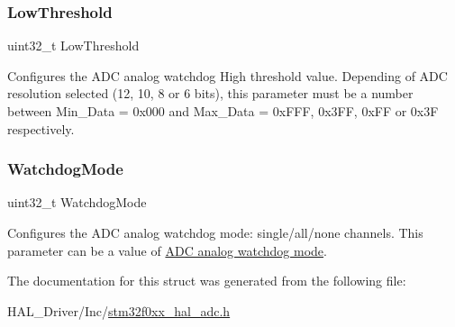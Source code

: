 \subsubsection{\texorpdfstring{Low\+Threshold}{LowThreshold}}
{\footnotesize\ttfamily uint32\+\_\+t Low\+Threshold}

Configures the A\+DC analog watchdog High threshold value. Depending of A\+DC resolution selected (12, 10, 8 or 6 bits), this parameter must be a number between Min\+\_\+\+Data = 0x000 and Max\+\_\+\+Data = 0x\+F\+FF, 0x3\+FF, 0x\+FF or 0x3F respectively. \mbox{\label{struct_a_d_c___analog_w_d_g_conf_type_def_a13924e920be2454c955a2139e2c3eb1a}} 
\subsubsection{\texorpdfstring{Watchdog\+Mode}{WatchdogMode}}
{\footnotesize\ttfamily uint32\+\_\+t Watchdog\+Mode}

Configures the A\+DC analog watchdog mode\+: single/all/none channels. This parameter can be a value of \hyperlink{group___a_d_c__analog__watchdog__mode}{A\+DC analog watchdog mode}. 

The documentation for this struct was generated from the following file\+:\begin{DoxyCompactItemize}
\item 
H\+A\+L\+\_\+\+Driver/\+Inc/\hyperlink{stm32f0xx__hal__adc_8h}{stm32f0xx\+\_\+hal\+\_\+adc.\+h}\end{DoxyCompactItemize}
